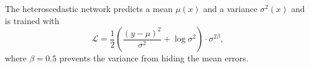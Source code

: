 The heteroscedastic network predicts a mean $\mu(x)$ and a variance $\sigma^2(x)$ and is trained with
\begin{equation}
\mathcal{L} = \frac{1}{2}\left(\frac{(y - \mu)^2}{\sigma^2} + \log \sigma^2\right) \cdot \sigma^{2\beta},
\label{eq:beta_nll}
\end{equation}
where $\beta = 0.5$ prevents the variance from hiding the mean errors.

% 
%     
%     
% 
